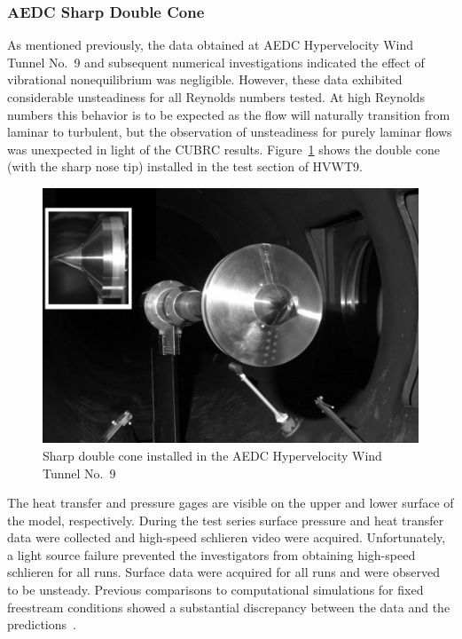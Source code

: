 \subsubsection{AEDC Sharp Double Cone}
As mentioned previously, the data obtained at AEDC Hypervelocity Wind Tunnel No.~9 and subsequent numerical investigations indicated the effect of vibrational nonequilibrium was negligible. However, these data exhibited considerable unsteadiness for all Reynolds numbers tested.  At high Reynolds numbers this behavior is to be expected as the flow will naturally transition from laminar to turbulent, but the observation of unsteadiness for purely laminar flows was unexpected in light of the CUBRC results.  Figure~\ref{fig:double_cone_in_tunnel_AEDC} shows the double cone (with the sharp nose tip) installed in the test section of HVWT9.
\begin{figure}[hbtp]
  \begin{center}
    \includegraphics[width=\textwidth]{figures/aedc_double_cone/double_cone_HVWT9}
    \caption[Sharp double cone installed in the AEDC Hypervelocity Wind Tunnel No.~9]{Sharp double cone installed in the AEDC Hypervelocity Wind Tunnel No.~9~\cite{AEDC_HVWT9_double_cone}\label{fig:double_cone_in_tunnel_AEDC}}
  \end{center}
\end{figure}

The heat transfer and pressure gages are visible on the upper and lower surface of the model, respectively.
During the test series surface pressure and heat transfer data were collected and high-speed schlieren video were acquired.  Unfortunately, a light source failure prevented the investigators from obtaining high-speed schlieren for all runs.  Surface data were acquired for all runs and were observed to be unsteady.  Previous comparisons to computational simulations for fixed freestream conditions showed a substantial discrepancy between the data and the predictions~\cite{AEDC_HVWT9_double_cone}.


